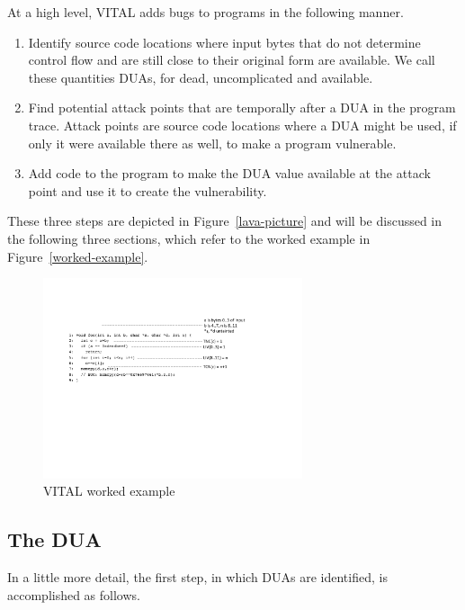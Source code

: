 
At a high level, VITAL adds bugs to programs in the following manner.

\begin {enumerate}
\item Identify source code locations where input bytes that do not determine control flow and are still close to their original form are available. 
We call these quantities DUAs, for dead, uncomplicated and available. 
\item Find potential attack points that are temporally after a DUA in the program trace.
Attack points are source code locations where a DUA might be used, if only it were available there as well, to make a program vulnerable. 
\item Add code to the program to make the DUA value available at the attack point and use it to create the vulnerability. 
\end{enumerate}

These three steps are depicted in Figure~\ref{lava-picture} and will be discussed in the following three sections,
which refer to the worked example in Figure~\ref{worked-example}.


\begin{figure} 
\centering
\includegraphics[width=3in]{worked-example.pdf}
\caption{
VITAL worked example
}
\label{fig:worked-example}
\end{figure}



\subsection {The DUA}

In a little more detail, the first step, in which DUAs are identified, is accomplished as follows.  

